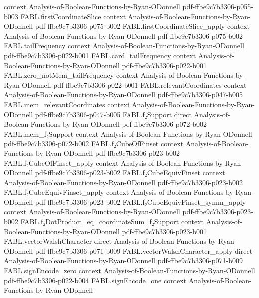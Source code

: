 \begin{theorem}
  {context}
  {Analysis-of-Boolean-Functions-by-Ryan-ODonnell}
  {pdf-ffbe9c7b3306-p055-b003}
\proofstep
  {FABL.firstCoordinateSlice}
  {context}
  {Analysis-of-Boolean-Functions-by-Ryan-ODonnell}
  {pdf-ffbe9c7b3306-p075-b002}
\proofstep
  {FABL.firstCoordinateSlice_apply}
  {context}
  {Analysis-of-Boolean-Functions-by-Ryan-ODonnell}
  {pdf-ffbe9c7b3306-p075-b002}
\proofstep
  {FABL.tailFrequency}
  {context}
  {Analysis-of-Boolean-Functions-by-Ryan-ODonnell}
  {pdf-ffbe9c7b3306-p022-b001}
\proofstep
  {FABL.card_tailFrequency}
  {context}
  {Analysis-of-Boolean-Functions-by-Ryan-ODonnell}
  {pdf-ffbe9c7b3306-p022-b001}
\proofstep
  {FABL.zero_notMem_tailFrequency}
  {context}
  {Analysis-of-Boolean-Functions-by-Ryan-ODonnell}
  {pdf-ffbe9c7b3306-p022-b001}
\proofstep
  {FABL.relevantCoordinates}
  {context}
  {Analysis-of-Boolean-Functions-by-Ryan-ODonnell}
  {pdf-ffbe9c7b3306-p047-b005}
\proofstep
  {FABL.mem_relevantCoordinates}
  {context}
  {Analysis-of-Boolean-Functions-by-Ryan-ODonnell}
  {pdf-ffbe9c7b3306-p047-b005}
\proofstep
  {FABL.f₂Support}
  {direct}
  {Analysis-of-Boolean-Functions-by-Ryan-ODonnell}
  {pdf-ffbe9c7b3306-p072-b002}
\proofstep
  {FABL.mem_f₂Support}
  {context}
  {Analysis-of-Boolean-Functions-by-Ryan-ODonnell}
  {pdf-ffbe9c7b3306-p072-b002}
\proofstep
  {FABL.f₂CubeOfFinset}
  {context}
  {Analysis-of-Boolean-Functions-by-Ryan-ODonnell}
  {pdf-ffbe9c7b3306-p023-b002}
\proofstep
  {FABL.f₂CubeOfFinset_apply}
  {context}
  {Analysis-of-Boolean-Functions-by-Ryan-ODonnell}
  {pdf-ffbe9c7b3306-p023-b002}
\proofstep
  {FABL.f₂CubeEquivFinset}
  {context}
  {Analysis-of-Boolean-Functions-by-Ryan-ODonnell}
  {pdf-ffbe9c7b3306-p023-b002}
\proofstep
  {FABL.f₂CubeEquivFinset_apply}
  {context}
  {Analysis-of-Boolean-Functions-by-Ryan-ODonnell}
  {pdf-ffbe9c7b3306-p023-b002}
\proofstep
  {FABL.f₂CubeEquivFinset_symm_apply}
  {context}
  {Analysis-of-Boolean-Functions-by-Ryan-ODonnell}
  {pdf-ffbe9c7b3306-p023-b002}
\proofstep
  {FABL.f₂DotProduct_eq_coordinateSum_f₂Support}
  {context}
  {Analysis-of-Boolean-Functions-by-Ryan-ODonnell}
  {pdf-ffbe9c7b3306-p023-b001}
\proofstep
  {FABL.vectorWalshCharacter}
  {direct}
  {Analysis-of-Boolean-Functions-by-Ryan-ODonnell}
  {pdf-ffbe9c7b3306-p071-b009}
\proofstep
  {FABL.vectorWalshCharacter_apply}
  {direct}
  {Analysis-of-Boolean-Functions-by-Ryan-ODonnell}
  {pdf-ffbe9c7b3306-p071-b009}
\proofstep
  {FABL.signEncode_zero}
  {context}
  {Analysis-of-Boolean-Functions-by-Ryan-ODonnell}
  {pdf-ffbe9c7b3306-p022-b004}
\proofstep
  {FABL.signEncode_one}
  {context}
  {Analysis-of-Boolean-Functions-by-Ryan-ODonnell}

\end{theorem}
